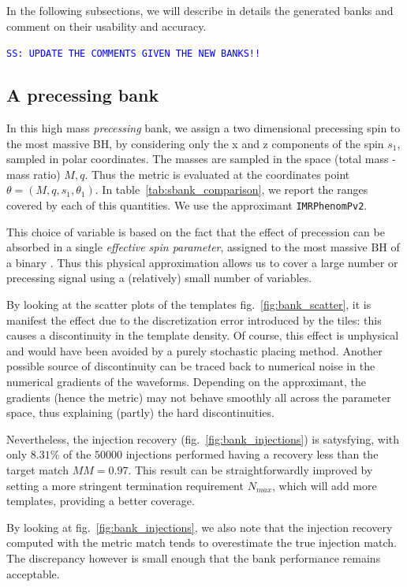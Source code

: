 \documentclass[twocolumn,showpacs,preprintnumbers,nofootinbib,prd,
superscriptaddress,10pt]{revtex4-2}
\newcommand{\stefano}[1]{{\textcolor{blue}{\texttt{SS: #1}} }}
\begin{document}
In the following subsections, we will describe in details the generated banks and comment on their usability and accuracy.

\stefano{UPDATE THE COMMENTS GIVEN THE NEW BANKS!!}
\subsection{A precessing bank}\label{sec:precessing_bank}
	
In this high mass {\it precessing} bank, we assign a two dimensional precessing spin to the most massive BH, by considering only the x and z components of the spin $s_1$, sampled in polar coordinates. The masses are sampled in the space (total mass - mass ratio) $M,q$.  Thus the metric is evaluated at the coordinates point $\theta = (M, q, s_1, \theta_1)$. In table~\ref{tab:sbank_comparison}, we report the ranges covered by each of this quantities. We use the approximant \texttt{IMRPhenomPv2}.

This choice of variable is based on the fact that the effect of precession can be absorbed in a single {\it effective spin parameter}, assigned to the most massive BH of a binary \cite{}. Thus this physical approximation allows us to cover a large number or precessing signal using a (relatively) small number of variables.

By looking at the scatter plots of the templates fig.~\ref{fig:bank_scatter}, it is manifest the effect due to the discretization error introduced by the tiles: this causes a discontinuity in the template density. Of course, this effect is unphysical and would have been avoided by a purely stochastic placing method.
Another possible source of discontinuity can be traced back to numerical noise in the numerical gradients of the waveforms. Depending on the approximant, the gradients (hence the metric) may not behave smoothly all across the parameter space, thus explaining (partly) the hard discontinuities.

Nevertheless, the injection recovery (fig.~\ref{fig:bank_injections}) is satysfying, with only $8.31\%$ of the $50000$ injections performed having a recovery less than the target match $MM = 0.97$.
This result can be straightforwardly improved by setting a more stringent termination requirement $N_{max}$, which will add more templates, providing a better coverage.

By looking at fig.~\ref{fig:bank_injections}, we also note that the injection recovery computed with the metric match tends to overestimate the true injection match. The discrepancy however is small enough that the bank performance remains acceptable.
\end{document}
